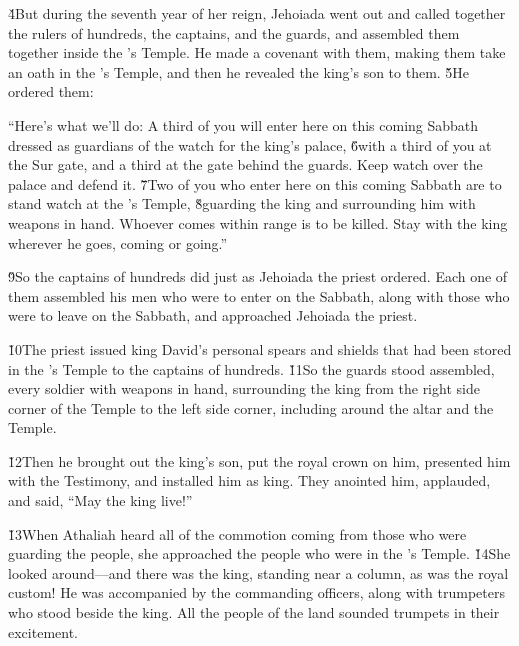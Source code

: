 \v{4}But during the seventh year of her reign, Jehoiada went out and called together the rulers of hundreds, the captains, and the guards, and assembled them together inside the 's Temple. He made a covenant with them, making them take an oath in the 's Temple, and then he revealed the king's son to them. \v{5}He ordered them:

\begin{poetry}
\poeml ``Here's what we'll do: A third of you will enter here on this coming Sabbath dressed as guardians of the watch for the king's palace, \v{6}with a third of you at the Sur gate, and a third at the gate behind the guards. Keep watch over the palace and defend it. \v{7}Two of you who enter here on this coming Sabbath are to stand watch at the 's Temple, \v{8}guarding the king and surrounding him with weapons in hand. Whoever comes within range is to be killed. Stay with the king wherever he goes, coming or going.''
\end{poetry}

\v{9}So the captains of hundreds did just as Jehoiada the priest ordered. Each one of them assembled his men who were to enter on the Sabbath, along with those who were to leave on the Sabbath, and approached Jehoiada the priest.

\v{10}The priest issued king David's personal spears and shields that had been stored in the 's Temple to the captains of hundreds. \v{11}So the guards stood assembled, every soldier with weapons in hand, surrounding the king from the right side corner of the Temple to the left side corner, including around the altar and the Temple.

\v{12}Then he brought out the king's son, put the royal crown on him, presented him with the Testimony, and installed him as king. They anointed him, applauded, and said, ``May the king live!''

\v{13}When Athaliah heard all of the commotion coming from those who were guarding the people, she approached the people who were in the 's Temple. \v{14}She looked around---and there was the king, standing near a column, as was the royal custom! He was accompanied by the commanding officers, along with trumpeters who stood beside the king. All the people of the land sounded trumpets in their excitement.

